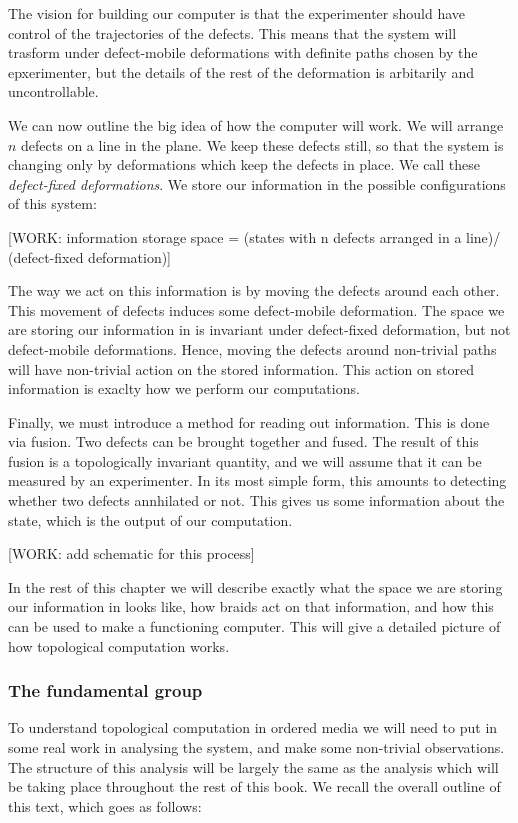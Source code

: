 The vision for building our computer is that the experimenter should have control of the trajectories of the defects. This means that the system will trasform under defect-mobile deformations with definite paths chosen by the epxerimenter, but the details of the rest of the deformation is arbitarily and uncontrollable.

We can now outline the big idea of how the computer will work. We will arrange $n$ defects on a line in the plane. We keep these defects still, so that the system is changing only by deformations which keep the defects in place. We call these \textit{defect-fixed deformations}. We store our information in the possible configurations of this system:

[WORK: information storage space = (states with n defects arranged in a line)/ (defect-fixed deformation)]

The way we act on this information is by moving the defects around each other. This movement of defects induces some defect-mobile deformation. The space we are storing our information in is invariant under defect-fixed deformation, but not defect-mobile deformations. Hence, moving the defects around non-trivial paths will have non-trivial action on the stored information. This action on stored information is exaclty how we perform our computations.

Finally, we must introduce a method for reading out information. This is done via fusion. Two defects can be brought together and fused. The result of this fusion is a topologically invariant quantity, and we will assume that it can be measured by an experimenter. In its most simple form, this amounts to detecting whether two defects annhilated or not.  This gives us some information about the state, which is the output of our computation.

[WORK: add schematic for this process]

In the rest of this chapter we will describe exactly what the space we are storing our information in looks like, how braids act on that information, and how this can be used to make a functioning computer. This will give a detailed picture of how topological computation works.

\subsubsection{The fundamental group}

To understand topological computation in ordered media we will need to put in some real work in analysing the system, and make some non-trivial observations. The structure of this analysis will be largely the same as the analysis which will be taking place throughout the rest of this book. We recall the overall outline of this text, which goes as follows:

